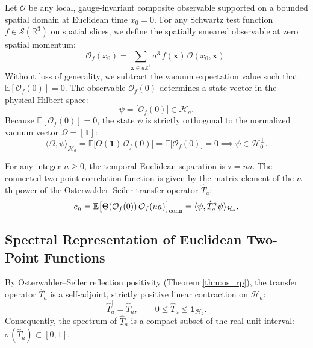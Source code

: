 Let $\mathcal{O}$ be any local, gauge-invariant composite observable supported on a bounded spatial domain at Euclidean time $x_0 = 0$. For any Schwartz test function $f \in \mathcal{S}(\mathbb{R}^3)$ on spatial slices, we define the spatially smeared observable at zero spatial momentum:
\begin{equation}
\label{eq:ch9_smeared_observable}
\mathcal{O}_f(x_0) = \sum_{\mathbf{x} \in a \mathbb{Z}^3} a^3 \, f(\mathbf{x}) \, \mathcal{O}(x_0, \mathbf{x}).
\end{equation}
Without loss of generality, we subtract the vacuum expectation value such that $\mathbb{E}[\mathcal{O}_f(0)] = 0$. The observable $\mathcal{O}_f(0)$ determines a state vector in the physical Hilbert space:
\begin{equation}
\psi = \bigl[ \mathcal{O}_f(0) \bigr] \in \mathcal{H}_a.
\end{equation}
Because $\mathbb{E}[\mathcal{O}_f(0)] = 0$, the state $\psi$ is strictly orthogonal to the normalized vacuum vector $\Omega = [\mathbf{1}]$:
\begin{equation}
\langle \Omega, \psi \rangle_{\mathcal{H}_a} = \mathbb{E}\bigl[ \Theta(\mathbf{1}) \, \mathcal{O}_f(0) \bigr] = \mathbb{E}\bigl[ \mathcal{O}_f(0) \bigr] = 0 \implies \psi \in \mathcal{H}_0^\perp.
\end{equation}

For any integer $n \ge 0$, the temporal Euclidean separation is $\tau = n a$. The connected two-point correlation function is given by the matrix element of the $n$-th power of the Osterwalder--Seiler transfer operator $\hat{T}_a$:
\begin{equation}
\label{eq:ch9_cn_definition}
c_n = \mathbb{E}\bigl[ \Theta(\mathcal{O}_f(0)) \, \mathcal{O}_f(n a) \bigr]_{\mathrm{conn}} = \langle \psi, \hat{T}_a^n \psi \rangle_{\mathcal{H}_a}.
\end{equation}

\subsection{Spectral Representation of Euclidean Two-Point Functions}
\label{subsec:spectral_rep_two_point}

By Osterwalder--Seiler reflection positivity (Theorem \ref{thm:os_rp}), the transfer operator $\hat{T}_a$ is a self-adjoint, strictly positive linear contraction on $\mathcal{H}_a$:
\begin{equation}
\label{eq:ch9_transfer_operator_bounds}
\hat{T}_a^\dagger = \hat{T}_a, \qquad 0 \le \hat{T}_a \le \mathbf{1}_{\mathcal{H}_a}.
\end{equation}
Consequently, the spectrum of $\hat{T}_a$ is a compact subset of the real unit interval: $\sigma(\hat{T}_a) \subset [0, 1]$.

